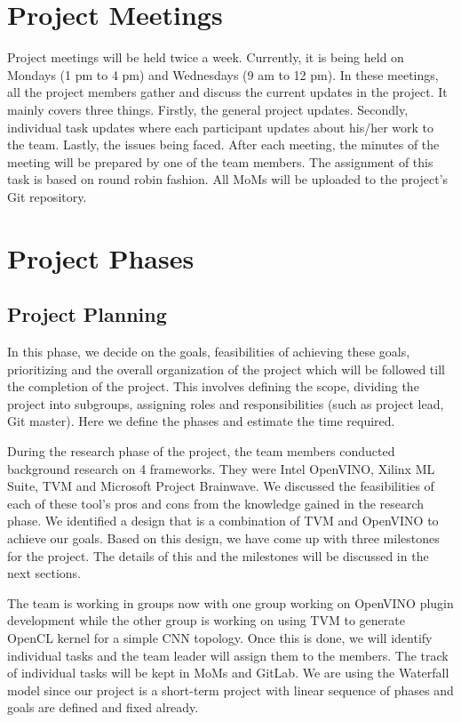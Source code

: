 \documentclass[titlepage]{report}
\begin{document}
\section{Project Meetings}
Project meetings will be held twice a week. Currently, it is being held on Mondays (1 pm to 4 pm) and Wednesdays (9 am to 12 pm). In these meetings, all the project members gather and discuss the current updates in the project. It mainly covers three things. Firstly, the general project updates. Secondly, individual task updates where each participant updates about his/her work to the team. Lastly, the issues being faced. After each meeting, the minutes of the meeting will be prepared by one of the team members. The assignment of this task is based on round robin fashion. All MoMs will be uploaded to the project’s Git repository.


\section{Project Phases}
\subsection{Project Planning}
In this phase, we decide on the goals, feasibilities of achieving these goals, prioritizing and the overall organization of the project which will be followed till the completion of the project. This involves defining the scope, dividing the project into subgroups, assigning roles and responsibilities (such as project lead, Git master). Here we define the phases and estimate the time required. 

During the research phase of the project, the team members conducted background research on 4 frameworks. They were Intel OpenVINO, Xilinx ML Suite, TVM and Microsoft Project Brainwave. We discussed the feasibilities of each of these tool's pros and cons from the knowledge gained in the research phase. We identified a design that is a combination of TVM and OpenVINO to achieve our goals. Based on this design, we have come up with three milestones for the project. The details of this and the milestones will be discussed in the next sections.

The team is working in groups now with one group working on OpenVINO plugin development while the other group is working on using TVM to generate OpenCL kernel for a simple CNN topology. Once this is done, we will identify individual tasks and the team leader will assign them to the members. The track of individual tasks will be kept in MoMs and GitLab. We are using the Waterfall model since our project is a short-term project with linear sequence of phases and goals are defined and fixed already. 
\end{document}
